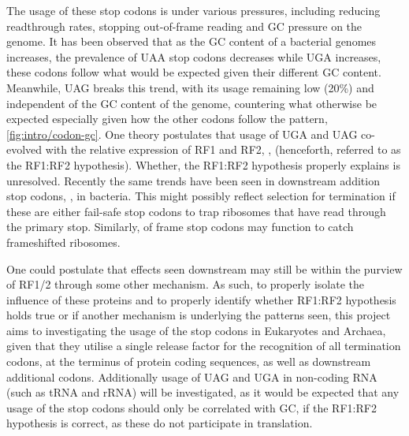 \documentclass[
    emulatestandardclasses,
    parskip=half,
]{scrartcl}
\begin{document}
        The usage of these stop codons is under various pressures, including reducing readthrough rates, stopping out-of-frame reading and GC pressure on the genome. It has been observed that as the GC content of a bacterial genomes increases, the prevalence of UAA stop codons decreases while UGA increases, these codons follow what would be expected given their different GC content. Meanwhile, UAG breaks this trend, with its usage remaining low (20\%) and independent of the GC content of the genome, countering what otherwise be expected especially given how the other codons follow the pattern, \cref{fig:intro/codon-gc}. One theory postulates that usage of UGA and UAG co-evolved with the relative expression of RF1 and RF2, \mancite\autocite{Korkmaz2014}, (henceforth, referred to as the RF1:RF2 hypothesis). Whether, the RF1:RF2 hypothesis properly explains is unresolved. Recently the same trends have been seen in downstream addition stop codons, \autocite{Ho2019}, in bacteria. This might possibly reflect selection for termination if these are either fail-safe stop codons to trap ribosomes that have read through the primary stop. Similarly, of frame stop codons may function to catch frameshifted ribosomes.

        One could postulate that effects seen downstream may still be within the purview of RF1/2 through some other mechanism. As such, to properly isolate the influence of these proteins and to properly identify whether RF1:RF2 hypothesis holds true or if another mechanism is underlying the patterns seen, this project aims to investigating the usage of the stop codons in Eukaryotes and Archaea, given that they utilise a single release factor for the recognition of all termination codons, at the terminus of protein coding sequences, as well as downstream additional codons. Additionally usage of UAG and UGA in non-coding RNA (such as tRNA and rRNA) will be investigated, as it would be expected that any usage of the stop codons should only be correlated with GC, if the RF1:RF2 hypothesis is correct, as these do not participate in translation.


\end{document}
